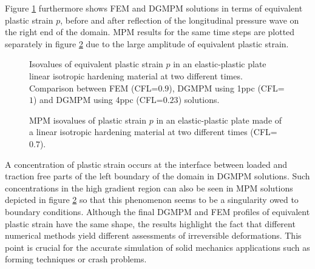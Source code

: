 Figure \ref{fig:2dEP_comparison} furthermore shows FEM and DGMPM solutions in terms of equivalent plastic strain $p$, before and after reflection of the longitudinal pressure wave on the right end of the domain.
MPM results for the same time steps are plotted separately in figure \ref{fig:2dEP_mpm} due to the large amplitude of equivalent plastic strain.
\begin{figure}[h!]
  \centering
  
  \caption{Isovalues of equivalent plastic strain $p$ in an elastic-plastic plate linear isotropic hardening material at two different times. Comparison between FEM (CFL=$0.9$), DGMPM using 1ppc (CFL=$1$) and DGMPM using 4ppc (CFL=$0.23$) solutions.}
  \label{fig:2dEP_comparison}
\end{figure}
\begin{figure}[h!]
  \centering
  
  \caption{MPM isovalues of plastic strain $p$ in an elastic-plastic plate made of a linear isotropic hardening material at two different times (CFL=$0.7$).}
  \label{fig:2dEP_mpm}
\end{figure}
A concentration of plastic strain occurs at the interface between loaded and traction free parts of the left boundary of the domain in DGMPM solutions. 
Such concentrations in the high gradient region can also be seen in MPM solutions depicted in figure \ref{fig:2dEP_mpm} so that this phenomenon seems to be a singularity owed to boundary conditions.
Although the final DGMPM and FEM profiles of equivalent plastic strain have the same shape, the results highlight the fact that different numerical methods yield different assessments of irreversible deformations.
This point is crucial for the accurate simulation of solid mechanics applications such as forming techniques or crash problems.




